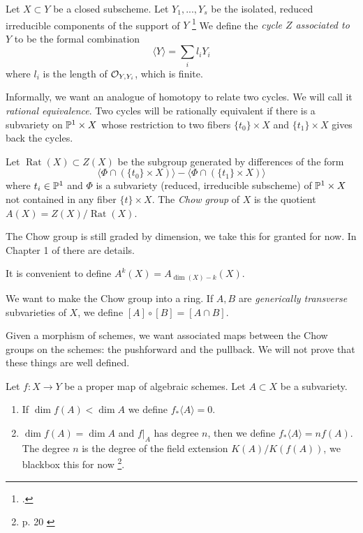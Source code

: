 \begin{definition}
	Let $X \subset Y$ be a closed subscheme. Let $Y_1, ..., Y_s$ be the isolated, reduced irreducible components of the support of $Y$ \footnote{.}
	We define the \emph{cycle $Z$ associated to $Y$} to be the formal combination \[
    	\langle Y \rangle = \sum_i l_i Y_i
    \] where $l_i$ is the length of $\mathcal{O}_{Y, Y_i}$, which is finite.
\end{definition}

Informally, we want an analogue of homotopy to relate two cycles. We will call it \emph{rational equivalence}. Two cycles will be rationally equivalent if there is a subvariety on $\mathbb{P}^1 \times X$ whose restriction to two fibers $\{t_0\} \times X$ and $\{t_1\} \times X$ gives back the cycles. 

\begin{definition}
	Let $\operatorname{Rat}(X) \subset Z(X)$ be the subgroup generated by differences of the form 
	\[
    	\langle \Phi \cap (\{t_0\} \times X) \rangle - \langle \Phi \cap (\{t_1\} \times X) \rangle
    \] where $t_i \in \mathbb{P}^1$ and $\Phi$ is a subvariety (reduced, irreducible subscheme) of $\mathbb{P}^1 \times X$ not contained in any fiber $\{t\} \times X$. 
	The \emph{Chow group} of $X$ is the quotient $A(X) = Z(X) / \operatorname{Rat}(X)$.
\end{definition}
The Chow group is still graded by dimension, we take this for granted for now. In Chapter 1 of \cite{eisenbud20163264} there are details. 

\begin{notation}
It is convenient to define $A^k(X) = A_{\dim(X) - k}(X)$. 
\end{notation}

\begin{definition}
We want to make the Chow group into a ring. If $A, B$ are \emph{generically transverse} subvarieties of $X$, we define $[A] \circ [B] = [A \cap B]$.
\end{definition}

Given a morphism of schemes, we want associated maps between the Chow groups on the schemes: the pushforward and the pullback. We will not prove that these things are well defined.

\begin{definition}
	Let $f: X \to Y$ be a proper map of algebraic schemes. Let $A \subset X$ be a subvariety. 
	\begin{enumerate}
    	\item If $\dim f(A) < \dim A$ we define $f_*\langle A \rangle = 0$.
		\item $\dim f(A) = \dim A$ and $f|_A$ has degree $n$, then we define $f_*\langle A \rangle = n f(A)$. The degree $n$ is the degree of the field extension $K(A)/K(f(A))$, we blackbox this for now \footnote{ p. 20 \cite{eisenbud20163264}}.
    \end{enumerate}
\end{definition}


